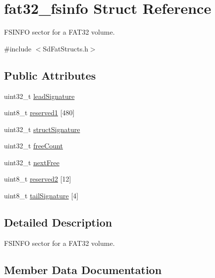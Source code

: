 \hypertarget{structfat32__fsinfo}{}\section{fat32\+\_\+fsinfo Struct Reference}
\label{structfat32__fsinfo}


F\+S\+I\+N\+FO sector for a F\+A\+T32 volume.  




{\ttfamily \#include $<$Sd\+Fat\+Structs.\+h$>$}

\subsection*{Public Attributes}
\begin{DoxyCompactItemize}
\item 
uint32\+\_\+t \hyperlink{structfat32__fsinfo_aa8ee056cc1beb1355e15610c1beba5e3}{lead\+Signature}
\item 
uint8\+\_\+t \hyperlink{structfat32__fsinfo_ac24bd4801a60a54e5133ed1bb71bcdaa}{reserved1} \mbox{[}480\mbox{]}
\item 
uint32\+\_\+t \hyperlink{structfat32__fsinfo_aa4a9ed657a0f58a7a1c75760c3a79fd4}{struct\+Signature}
\item 
uint32\+\_\+t \hyperlink{structfat32__fsinfo_a6c2d84388c0a38a74f7682fd602492c7}{free\+Count}
\item 
uint32\+\_\+t \hyperlink{structfat32__fsinfo_a539b3bb0a2ead9df417df9ac8b6b1606}{next\+Free}
\item 
uint8\+\_\+t \hyperlink{structfat32__fsinfo_a9ec0e2756cd7e169268798a558df3814}{reserved2} \mbox{[}12\mbox{]}
\item 
uint8\+\_\+t \hyperlink{structfat32__fsinfo_a484dd16425e4e687dc914d12309470e0}{tail\+Signature} \mbox{[}4\mbox{]}
\end{DoxyCompactItemize}


\subsection{Detailed Description}
F\+S\+I\+N\+FO sector for a F\+A\+T32 volume. 

\subsection{Member Data Documentation}
